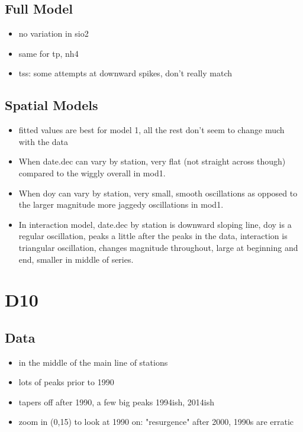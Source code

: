 \documentclass[12pt]{amsart}
\begin{document}
\subsection{Full Model}

\begin{itemize}
\item no variation in sio2
\item same for tp, nh4
\item tss: some attempts at downward spikes, don't really match
\end{itemize}

\subsection{Spatial Models}

\begin{itemize}
\item fitted values are best for model 1, all the rest don't seem to change much with the data
\item When date.dec can vary by station, very flat (not straight across though) compared to the wiggly overall in mod1.
\item When doy can vary by station, very small, smooth oscillations as opposed to the larger magnitude more jaggedy oscillations in mod1.
\item In interaction model, date.dec by station is downward sloping line, doy is a regular oscillation, peaks a little after the peaks in the data, interaction is triangular oscillation, changes magnitude throughout, large at beginning and end, smaller in middle of series.
\end{itemize}

\section{D10}
\subsection{Data}
\begin{itemize}
\item in the middle of the main line of stations
\item lots of peaks prior to 1990
\item tapers off after 1990, a few big peaks 1994ish, 2014ish
\item zoom in (0,15) to look at 1990 on: "resurgence" after 2000, 1990s are erratic
\end{itemize}
\end{document}
